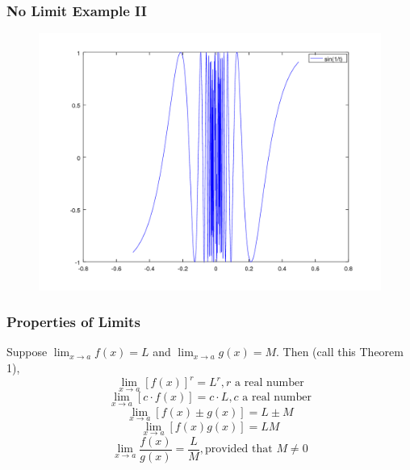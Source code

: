 \documentclass[xcolor=dvipsnames]{beamer}
\begin{document}
\begin{frame}
  \frametitle{No Limit Example II}
  \begin{figure}[h]
    \includegraphics[scale=.5]{./diagrams/sineoneoverx.png}
  \end{figure}
\end{frame}

\begin{frame}
  \frametitle{Properties of Limits}
  Suppose $\lim_{x\rightarrow{}a}f(x)=L$ and
  $\lim_{x\rightarrow{}a}g(x)=M$. Then (call this \alert{Theorem 1}),
\begin{equation}
  \label{eq:johvoohu}
  \lim_{x\rightarrow{}a}[f(x)]^{r}=L^{r},r\mbox{ a real number}
\end{equation}
\begin{equation}
  \label{eq:eeyootoh}
  \lim_{x\rightarrow{}a}[c\cdot{}f(x)]=c\cdot{}L,c\mbox{ a real number}
\end{equation}
\begin{equation}
  \label{eq:kohzahwa}
  \lim_{x\rightarrow{}a}[f(x)\pm{}g(x)]=L\pm{}M
\end{equation}
\begin{equation}
  \label{eq:aekaqued}
  \lim_{x\rightarrow{}a}[f(x)g(x)]=LM
\end{equation}
\begin{equation}
  \label{eq:ahkeigae}
  \lim_{x\rightarrow{}a}\frac{f(x)}{g(x)}=\frac{L}{M},\mbox{provided that }M\neq{}0
\end{equation}
\end{frame}
\end{document}
